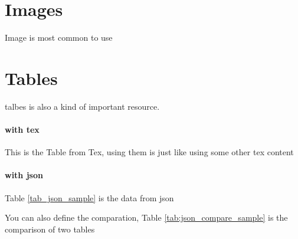 \documentclass{article}
\begin{document}
\section{Images}
Image is most common to use

\section{Tables}
talbes is also a kind of important resource.

\paragraph{with tex}
This is the Table from Tex, using them is just like using some other tex content
\begin{table}[h!]

\end{table}

\paragraph{with json}
Table \ref{tab_json_sample} is the data from json
\begin{table}[h!]

\end{table}

You can also define the comparation, Table \ref{tab:json_compare_sample} is the comparison of two tables

\begin{table}[h!]
    
\end{table}
\end{document}
